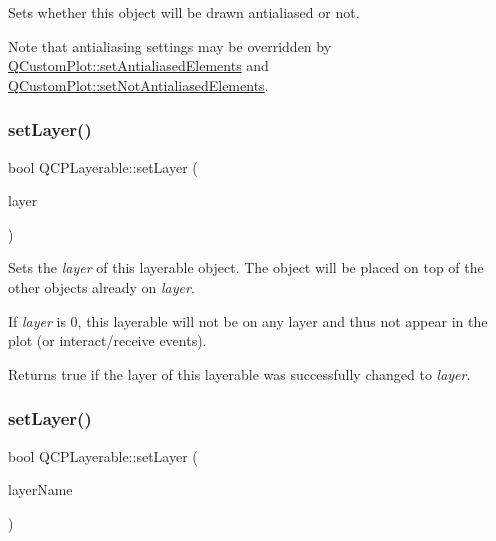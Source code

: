 Sets whether this object will be drawn antialiased or not.

Note that antialiasing settings may be overridden by \hyperlink{class_q_custom_plot_af6f91e5eab1be85f67c556e98c3745e8}{Q\+Custom\+Plot\+::set\+Antialiased\+Elements} and \hyperlink{class_q_custom_plot_ae10d685b5eabea2999fb8775ca173c24}{Q\+Custom\+Plot\+::set\+Not\+Antialiased\+Elements}. \hypertarget{class_q_c_p_layerable_ab0d0da6d2de45a118886d2c8e16d5a54}{}\label{class_q_c_p_layerable_ab0d0da6d2de45a118886d2c8e16d5a54} 
\subsubsection{\texorpdfstring{set\+Layer()}{setLayer()}\hspace{0.1cm}{\footnotesize\ttfamily [1/2]}}
{\footnotesize\ttfamily bool Q\+C\+P\+Layerable\+::set\+Layer (\begin{DoxyParamCaption}\item[{\hyperlink{class_q_c_p_layer}{Q\+C\+P\+Layer} $\ast$}]{layer }\end{DoxyParamCaption})}

Sets the {\itshape layer} of this layerable object. The object will be placed on top of the other objects already on {\itshape layer}.

If {\itshape layer} is 0, this layerable will not be on any layer and thus not appear in the plot (or interact/receive events).

Returns true if the layer of this layerable was successfully changed to {\itshape layer}. \hypertarget{class_q_c_p_layerable_ab25a0e7b897993b44447caee0f142083}{}\label{class_q_c_p_layerable_ab25a0e7b897993b44447caee0f142083} 
\subsubsection{\texorpdfstring{set\+Layer()}{setLayer()}\hspace{0.1cm}{\footnotesize\ttfamily [2/2]}}
{\footnotesize\ttfamily bool Q\+C\+P\+Layerable\+::set\+Layer (\begin{DoxyParamCaption}\item[{const Q\+String \&}]{layer\+Name }\end{DoxyParamCaption})}

